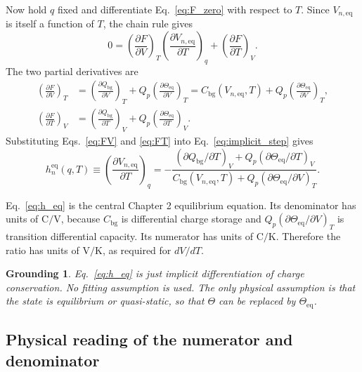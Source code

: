 \documentclass[11pt,a4paper]{article}
\newtheorem*{groundingbox}{Grounding}
\newcommand{\eqs}{\mathrm{eq}}
\newcommand{\bg}{\mathrm{bg}}
\begin{document}
Now hold \(q\) fixed and differentiate Eq.~\eqref{eq:F_zero} with respect to \(T\). Since \(V_{n,\eqs}\) is
itself a function of \(T\), the chain rule gives
\begin{equation}
0
=
\left(\frac{\partial F}{\partial V}\right)_T
\left(\frac{\partial V_{n,\eqs}}{\partial T}\right)_q
+
\left(\frac{\partial F}{\partial T}\right)_V.
\label{eq:implicit_step}
\end{equation}
The two partial derivatives are
\begin{align}
\left(\frac{\partial F}{\partial V}\right)_T
&=
\left(\frac{\partial Q_{\bg}}{\partial V}\right)_T
+Q_p\left(\frac{\partial\Theta_{\eqs}}{\partial V}\right)_T
=
C_{\bg}(V_{n,\eqs},T)
+Q_p\left(\frac{\partial\Theta_{\eqs}}{\partial V}\right)_T,
\label{eq:FV}\\
\left(\frac{\partial F}{\partial T}\right)_V
&=
\left(\frac{\partial Q_{\bg}}{\partial T}\right)_V
+Q_p\left(\frac{\partial\Theta_{\eqs}}{\partial T}\right)_V.
\label{eq:FT}
\end{align}
Substituting Eqs.~\eqref{eq:FV} and \eqref{eq:FT} into Eq.~\eqref{eq:implicit_step} gives
\begin{equation}
h_n^{\eqs}(q,T)
\equiv
\left(\frac{\partial V_{n,\eqs}}{\partial T}\right)_q
=
-\frac{
\left(\partial Q_{\bg}/\partial T\right)_V
+Q_p\left(\partial\Theta_{\eqs}/\partial T\right)_V}
{C_{\bg}(V_{n,\eqs},T)
+Q_p\left(\partial\Theta_{\eqs}/\partial V\right)_T}.
\label{eq:h_eq}
\end{equation}

Eq.~\eqref{eq:h_eq} is the central Chapter 2 equilibrium equation. Its denominator has units of
\(\mathrm{C/V}\), because \(C_{\bg}\) is differential charge storage and
\(Q_p(\partial\Theta_{\eqs}/\partial V)_T\) is transition differential capacity. Its numerator has units of
\(\mathrm{C/K}\). Therefore the ratio has units of \(\mathrm{V/K}\), as required for \(dV/dT\).

\begin{groundingbox}
Eq.~\eqref{eq:h_eq} is just implicit differentiation of charge conservation. No fitting assumption is used.
The only physical assumption is that the state is equilibrium or quasi-static, so that
\(\Theta\) can be replaced by \(\Theta_{\eqs}\).
\end{groundingbox}

\subsection{Physical reading of the numerator and denominator}\label{sec:physical_reading}
\end{document}
